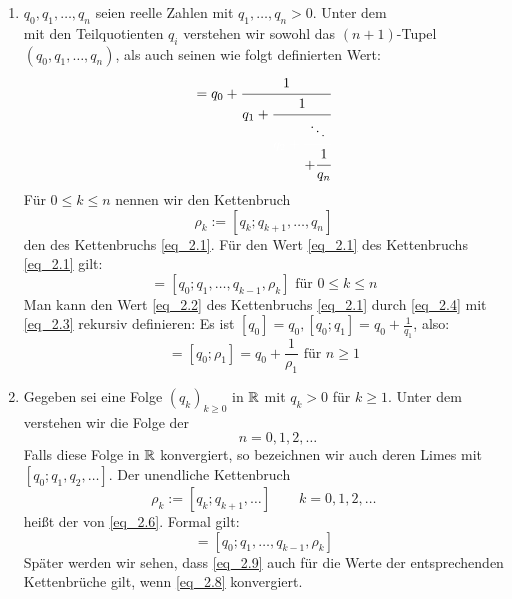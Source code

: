 \begin{defn} \label{def_2.4}
	\begin{enumerate}[1)]
		\item $q_0,q_1,\dots,q_n$ seien reelle Zahlen mit $q_1,\dots,q_n > 0$. Unter dem  
		\begin{equation}
			[q_0;q_1,\dots,q_n] \label{eq_2.1}
		\end{equation}
		mit den Teilquotienten $q_i$ verstehen wir sowohl das $(n+1)$-Tupel $(q_0,q_1,\dots,q_n)$, als auch seinen wie folgt definierten Wert:
		\begin{equation}
			[q_0;q_1,\dots,q_n] = q_0 + \cfrac{1}{q_1 + \cfrac{1}{\textcolor{white}{q_2 + \cfrac{\textcolor{black}{\ddots}}{\textcolor{black}{+\cfrac{1}{q_n}}}}}} \label{eq_2.2}
		\end{equation}
		Für $0 \leq k \leq n$ nennen wir den Kettenbruch
		\begin{equation}
			\rho_k := [q_k;q_{k+1},\dots,q_n] \label{eq_2.3}
		\end{equation}
		den  des Kettenbruchs \eqref{eq_2.1}. Für den Wert \eqref{eq_2.1} des Kettenbruchs \eqref{eq_2.1} gilt: 
		\begin{equation}
			[q_0;q_1,\dots,q_n] = [q_0;q_1,\dots,q_{k-1},\rho_k] \text{ für } 0 \leq k \leq n \label{eq_2.4}
		\end{equation}
		Man kann den Wert \eqref{eq_2.2} des Kettenbruchs \eqref{eq_2.1} durch \eqref{eq_2.4} mit \eqref{eq_2.3} rekursiv definieren: Es ist $[q_0] = q_0, [q_0;q_1] = q_0 + \frac{1}{q_1}$, also:
		\begin{equation}
			[q_0;q_1,\dots,q_n] = [q_0; \rho_1] = q_0 + \frac{1}{\rho_1} \text{ für } n \geq 1 \label{eq_2.5}
		\end{equation}
		\item Gegeben sei eine Folge $(q_k)_{k \geq 0}$ in $\mathbb{R}$ mit $q_k > 0$ für $k \geq 1$. Unter dem  
		\begin{equation}
			[q_0;q_1,q_2,\dots] \label{eq_2.6}
		\end{equation}
		verstehen wir die Folge der
		\begin{equation}
			[q_0;q_1,\dots,q_n] \qquad n=0,1,2,\dots \label{eq_2.7}
		\end{equation}
		Falls diese Folge in $\mathbb{R}$ konvergiert, so bezeichnen wir auch deren Limes mit $[q_0;q_1,q_2,\dots]$. Der unendliche Kettenbruch
		\begin{equation}
			\rho_k := [q_k;q_{k+1},\dots] \qquad k = 0,1,2,\dots \label{eq_2.8}
		\end{equation}
		heißt der  von \eqref{eq_2.6}. Formal gilt: 
		\begin{equation}
			[q_0;q_1,q_2,\dots] = [q_0;q_1,\dots,q_{k-1},\rho_k] \label{eq_2.9}
		\end{equation}
		Später werden wir sehen, dass \eqref{eq_2.9} auch für die Werte der entsprechenden Kettenbrüche gilt, wenn \eqref{eq_2.8} konvergiert.
	\end{enumerate}
\end{defn}

